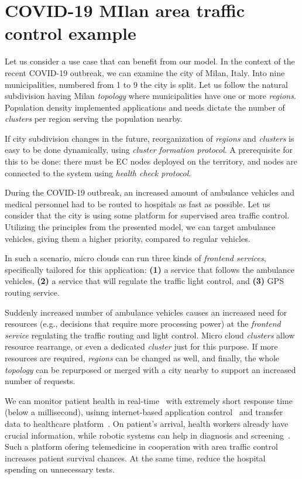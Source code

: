 \section{COVID-19 MIlan area traffic control example}\label{sec:covid_example}
%
Let us consider a use case that can benefit from our model. In the context of the recent COVID-19 outbreak, we can examine the city of Milan, Italy. Into nine municipalities, numbered from 1 to 9 the city is split. Let us follow the natural subdivision having Milan \emph{topology} where municipalities have one or more \emph{regions}. Population density implemented applications and needs dictate the number of \emph{clusters} per region serving the population nearby. 

If city subdivision changes in the future, reorganization of \emph{regions} and \emph{clusters} is easy to be done dynamically, using \emph{cluster formation protocol}. A prerequisite for this to be done: there must be EC nodes deployed on the territory, and nodes are connected to the system using \emph{health check protocol}.

During the COVID-19 outbreak, an increased amount of ambulance vehicles and medical personnel had to be routed to hospitals as fast as possible. Let us consider that the city is using some platform for supervised area traffic control. Utilizing the principles from the presented model, we can target ambulance vehicles, giving them a higher priority, compared to regular vehicles.

In such a scenario, micro clouds can run three kinds of \emph{frontend services}, specifically tailored for this application: \textbf{(1)} a service that follows the ambulance vehicles, \textbf{(2)} a service that will regulate the traffic light control, and \textbf{(3)} GPS routing service.

Suddenly increased number of ambulance vehicles causes an increased need for resources (e.g., decisions that require more processing power) at the \emph{frontend service} regulating the traffic routing and light control. Micro cloud \emph{clusters} allow resource rearrange, or even a dedicated \emph{cluster} just for this purpose. If more resources are required, \emph{regions} can be changed as well, and finally, the whole \emph{topology} can be repurposed or merged with a city nearby to support an increased number of requests.

We can monitor patient health in real-time~\cite{BCAK19, JeonK19, ChiariniRAMG13} with extremely short response time (below a millisecond), usinng internet-based application control~\cite{fitzek2021tactile} and transfer data to healthcare platform~\cite{OmarBBKR19, inproceedingsSimic5}. On patient's arrival, health workers already have crucial information, while robotic systems can help in diagnosis and screening~\cite{ShenGLMDXHKCZT21}. Such a platform ofering telemedicine in cooperation with area traffic control increases patient survival chances. At the same time, reduce the hospital spending on unnecessary tests.

